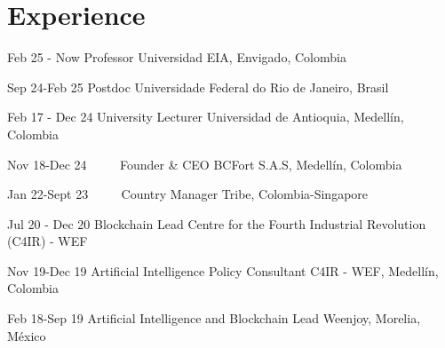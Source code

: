 \documentclass[]{friggeri-cv}
\begin{document}
\section{Experience}
\begin{entrylist}

\entry
{Feb 25 - Now}
{Professor}
{Universidad EIA, Envigado, Colombia}

\entry
{Sep 24-Feb 25}
{Postdoc}
{Universidade Federal do Rio de Janeiro, Brasil}

\entry
{Feb 17 - Dec 24}
{University Lecturer}
{Universidad de Antioquia, Medell\'in, Colombia}


\entry
{Nov 18-Dec 24 \ \ \ \ }
{Founder \& CEO}
{BCFort S.A.S, Medell\'in, Colombia}

\entry
{Jan 22-Sept 23 \ \ \ \ }
{Country Manager}
{Tribe, Colombia-Singapore}


\entry
{Jul 20 - Dec 20}
{Blockchain Lead}
{Centre for the Fourth Industrial Revolution (C4IR) - WEF}

\entry
{Nov 19-Dec 19}
{Artificial Intelligence Policy Consultant}
{C4IR - WEF, Medell\'in, Colombia}


\entry
{Feb 18-Sep 19}
{Artificial Intelligence and Blockchain Lead}
{Weenjoy, Morelia, M\'exico}



\end{entrylist}
\end{document}
